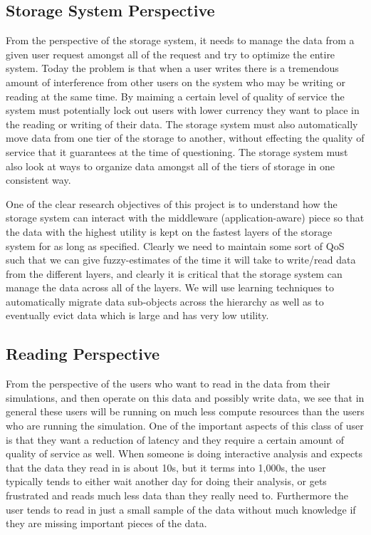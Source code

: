 \subsection{Storage System Perspective}
\label{subsec:storage-perspective}
From the perspective of the storage system, it needs to manage the data from
a given user request amongst all of the request and try to optimize the
entire system. Today the problem is that when a user writes there is a
tremendous amount of interference from other users on the system who may be
writing or reading at the same time. By maiming a certain level of quality
of service the system must potentially lock out users with lower currency
they want to place in the reading or writing of their data. The storage
system must also automatically move data from one tier of the storage to
another, without effecting the quality of service that it guarantees at the
time of questioning. The storage system must also look at ways to organize
data amongst all of the tiers of storage in one consistent way.

One of the clear research objectives of this project is to understand how the storage system can interact
with the middleware (application-aware) piece so that the data with the highest utility is kept on the fastest 
layers of the storage system for as long as specified. Clearly we need to maintain some sort of QoS such that
we can give fuzzy-estimates of the time it will take to write/read data from the different layers, and clearly it is critical
that the storage system can manage the data across all of the layers. We will use learning techniques to automatically
migrate data sub-objects across the hierarchy as well as to eventually evict data which is large and has very low utility.


\subsection{Reading  Perspective}
\label{subsec:reading-perspective}
From the perspective of the users who want to read in the data from their
simulations, and then operate on this data and possibly write data, we see
that in general these users will be running on much less compute resources
than the users who are running the simulation. One of the important aspects
of this class of user is that they want a reduction of latency and they
require a certain amount of quality of service as well. When someone is
doing interactive analysis and expects that the data they read in is about
10s, but it terms into 1,000s, the user typically tends to either wait
another day for doing their analysis, or gets frustrated and reads much less
data than they really need to. Furthermore the user tends to read in just a
small sample of the data without much knowledge if they are missing
important pieces of the data.

